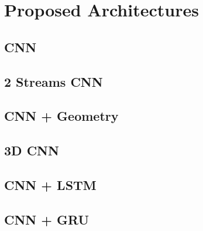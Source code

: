 \section{Proposed Architectures}

\subsection{CNN}



\subsection{2 Streams CNN}



\subsection{CNN + Geometry}



\subsection{3D CNN}



\subsection{CNN + LSTM}



\subsection{CNN + GRU}

